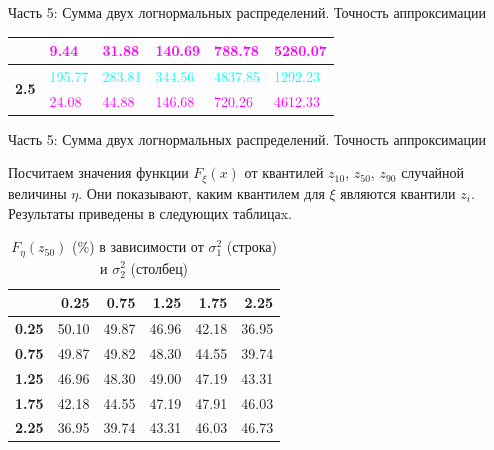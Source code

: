 \documentclass[ucs, notheorems, handout]{beamer}
\begin{document}
\begin{frame}{Часть 5: Сумма двух логнормальных распределений. Точность аппроксимации}
\begin{table}[]
\begin{tabular}{|c|l|l|l|l|l|}
				& \textcolor{magenta}{9.44}          & \textcolor{magenta}{31.88}         & \textcolor{magenta}{140.69}        & \textcolor{magenta}{788.78}        & \textcolor{magenta}{5280.07}      \\ \hline
				\multirow{2}{*}{\textbf{2.5}}  & \textcolor{cyan}{195.77}        & \textcolor{cyan}{283.81}        & \textcolor{cyan}{344.56}        & \textcolor{cyan}{4837.85}       & \textcolor{cyan}{1292.23}      \\ \cline{2-6} 
				& \textcolor{magenta}{24.08}         & \textcolor{magenta}{44.88}         & \textcolor{magenta}{146.68}        & \textcolor{magenta}{720.26}        & \textcolor{magenta}{4612.33}      \\ \hline
			\end{tabular}
		\end{table}
	
	\end{frame}
	
	
	\begin{frame}{Часть 5: Сумма двух логнормальных распределений. Точность аппроксимации}
		
		Посчитаем значения функции $F_{\xi}(x)$ от квантилей $z_{10}$, $z_{50}$, $z_{90}$ случайной величины $\eta$. Они показывают, каким квантилем для $\xi$ являются квантили $z_{i}$. Результаты приведены в следующих таблицаx.
		
		\begin{table}[!hhh]
			\centering
			\caption{$F_{\eta}(z_{50})$ ($\%$) в зависимости от $\sigma_{1}^{2}$ (строка) и $\sigma_{2}^{2}$ (столбец) }
			\label{tab4}
			\begin{tabular}{rrrrrr}
				\hline
				& \textbf{0.25} & \textbf{0.75} & \textbf{1.25} & \textbf{1.75} & \textbf{2.25} \\ 
				\hline
				\textbf{0.25} & 50.10 & 49.87 & 46.96 & 42.18 & 36.95 \\ 
				\textbf{0.75} & 49.87 & 49.82 & 48.30 & 44.55 & 39.74 \\ 
				\textbf{1.25} & 46.96 & 48.30 & 49.00 & 47.19 & 43.31 \\ 
				\textbf{1.75} & 42.18 & 44.55 & 47.19 & 47.91 & 46.03 \\ 
				\textbf{2.25} & 36.95 & 39.74 & 43.31 & 46.03 & 46.73 \\ 
				\hline
			\end{tabular}
		\end{table}
	
	\end{frame}
	
\end{document}

